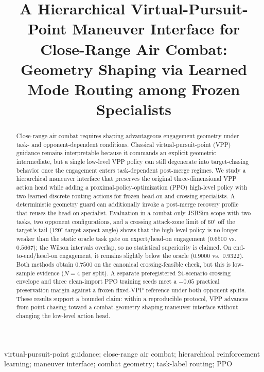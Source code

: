 \documentclass[5p,times]{elsarticle} %
\begin{document}
\begin{frontmatter}

\title{A Hierarchical Virtual-Pursuit-Point Maneuver Interface for Close-Range Air Combat: Geometry Shaping via Learned Mode Routing among Frozen Specialists}

\author{}

\address{}

\begin{abstract}
Close-range air combat requires shaping advantageous engagement geometry under task- and opponent-dependent conditions. Classical virtual-pursuit-point (VPP) guidance remains interpretable because it commands an explicit geometric intermediate, but a single low-level VPP policy can still degenerate into target-chasing behavior once the engagement enters task-dependent post-merge regimes. We study a hierarchical maneuver interface that preserves the original three-dimensional VPP action head while adding a proximal-policy-optimization (PPO) high-level policy with two learned discrete routing actions for frozen head-on and crossing specialists. A deterministic geometry guard can additionally invoke a post-merge recovery profile that reuses the head-on specialist. Evaluation in a combat-only JSBSim scope with two tasks, two opponent configurations, and a crossing attack-zone limit of $60^\circ$ off the target's tail ($120^\circ$ target aspect angle) shows that the high-level policy is no longer weaker than the static oracle task gate on expert/head-on engagement ($0.6500$ vs.\ $0.5667$); the Wilson intervals overlap, so no statistical superiority is claimed. On end-to-end/head-on engagement, it remains slightly below the oracle ($0.9000$ vs.\ $0.9322$). Both methods obtain $0.7500$ on the canonical crossing-feasible check, but this is low-sample evidence ($N=4$ per split). A separate preregistered 24-scenario crossing envelope and three clean-import PPO training seeds meet a $-0.05$ practical preservation margin against a frozen fixed-VPP reference under both opponent splits. These results support a bounded claim: within a reproducible protocol, VPP advances from point chasing toward a combat-geometry shaping maneuver interface without changing the low-level action head.
\end{abstract}

\begin{keyword}
virtual-pursuit-point guidance; close-range air combat; hierarchical reinforcement learning; maneuver interface; combat geometry; task-label routing; PPO
\end{keyword}


\end{frontmatter}
\end{document}
